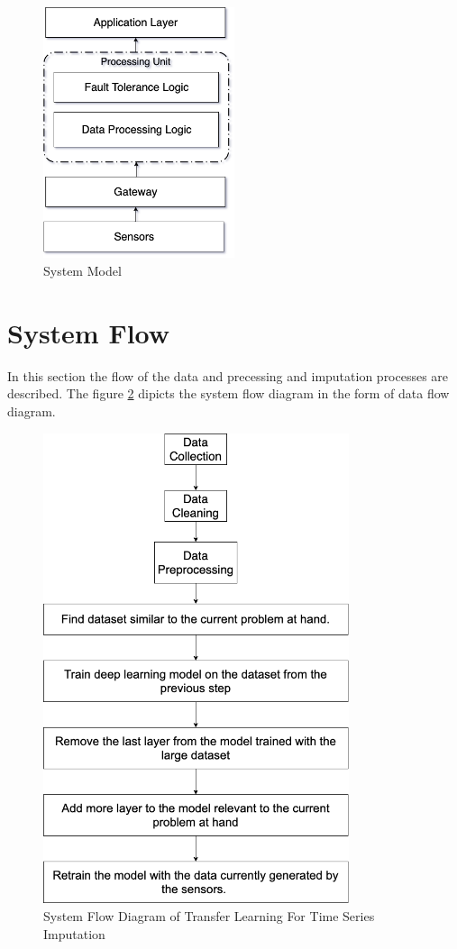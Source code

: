 \begin{figure}[ht]
	\centering
	\includegraphics[width=0.5\textwidth]{images/system-model.png}
	\caption{System Model}
	\label{fig:system-model}
\end{figure}

\section{System Flow}
In this section the flow of the data and precessing and imputation processes are described. The figure \ref{fig:system-flow-diagram} dipicts the system flow diagram in the form of data flow diagram.

\begin{figure}[ht]
	\centering
	\includegraphics[width=0.8\textwidth]{images/system-flow-diagram.png}
	\caption{System Flow Diagram of Transfer Learning For Time Series Imputation}
	\label{fig:system-flow-diagram}
\end{figure}




